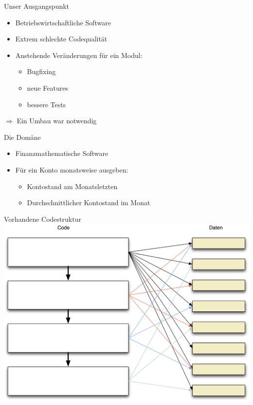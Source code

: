 \begin{frame}[fragile]{Unser Ausgangspunkt}
\begin{itemize}
\item Betriebswirtschaftliche Software
\item Extrem schlechte Codequalität
\item Anstehende Veränderungen für ein Modul:
\begin{itemize}
\item Bugfixing
\item neue Features
\item bessere Tests
\end{itemize}
\end{itemize}

$\Rightarrow$ Ein Umbau war notwendig
\end{frame}

\begin{frame}[fragile]{Die Domäne}
\begin{itemize}
\item Finanzmathematische Software
\end{itemize}

\begin{itemize}
\item Für ein Konto monatsweise ausgeben:
\begin{itemize}
\item Kontostand am Monatsletzten
\item Durchschnittlicher Kontostand im Monat
\end{itemize}
\end{itemize}

\end{frame}

\begin{frame}[fragile]{Vorhandene Codestruktur}
\includegraphics[width=.8 \paperwidth]{Codestruktur.png}
\end{frame}

